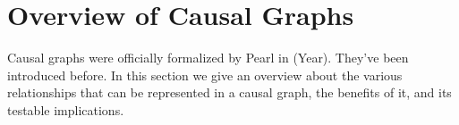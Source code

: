 \section{Overview of Causal Graphs}

Causal graphs were officially formalized by Pearl in (Year). They've been introduced before. In this section we give an overview about the various relationships that can be represented in a causal graph, the benefits of it, and its testable implications. 

\blindtext[2]